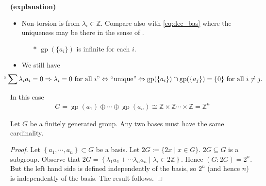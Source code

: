 \documentclass{article}
\newcommand{\bfs}[1]{\textbf{({#1}) }}
\newcommand{\gp}{\operatorname{gp}}
\begin{document}
\begin{rema}{\bfs{explanation}}
\begin{itemize}
    \item {Non-torsion} is from $\lambda_{i} \in \mathbb{Z}$. Compare also with \cref{eq:dec_bas} where the uniqueness may be there  in the sense of  .
    \begin{itemize}
        \item[$\ast$] $\gp(\{a_i\})$ is infinite for each $i$.
    \end{itemize}
    \item We still have 
    \begin{align}
   \hspace{-1cm} ``\sum \lambda_i a_i=0 \Rightarrow \lambda_{i}=0 \text{ for all } i " \Leftrightarrow \text{``unique''} \Leftrightarrow \gp(\{a_{i}\}) \cap \gp(\{a_{j}\})=\{0\}\text{ for all } i\ne j. \label{eq:uni_1}
\end{align}
\end{itemize}
 
\end{rema}




In this case
\begin{align}
G=\gp\left(a_{1}\right) \oplus \cdots \oplus \gp\left(a_{n}\right) \cong \mathbb{Z} \times \mathbb{Z} \cdots \times \mathbb{Z}=\mathbb{Z}^{n}\label{eq:free_abe_Zn}
\end{align}
\begin{lema}
 Let $G$ be a finitely generated  group. Any two bases must have the same cardinality.
\end{lema} 
\begin{proof}
 Let $\left\{a_{1}, \cdots, a_{n}\right\} \subset G$ be a basis. Let $2 G:=\{2 x \mid x \in G\}$. $2 G \subseteq G$ is a subgroup. Observe that $2 G=\left\{\lambda_{1} a_{1}+\cdots \lambda_{n} a_{n} \mid \lambda_i \in 2 \mathbb{Z}\right\} .$ Hence $(G: 2 G)=2^{n} .$ But the left hand side is defined independently of the basis, so $2^n$ (and hence $n$) is independently of the basis. The result follows.
\end{proof}
\end{document}
